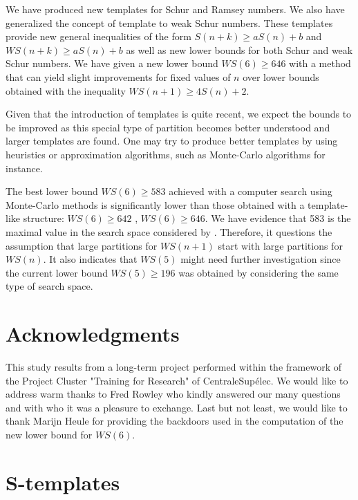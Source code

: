 \documentclass[final,onefignum,onetabnum]{siamart190516}
\newcommand{\WS}{\mathit{WS}}
\begin{document}
We have produced new templates for Schur and Ramsey numbers. We also have generalized the concept of template to weak Schur numbers.
These templates provide new general inequalities of the form \(S(n+k) \geqslant a S(n) + b\) and \(\WS(n+k) \geqslant a S(n) + b\)
as well as new lower bounds for both Schur and weak Schur numbers. We have given a new lower bound \(\WS(6) \geqslant 646\) with
a method that can yield slight improvements for fixed values of \(n\) over lower bounds obtained with the inequality
\(\WS(n+1) \geqslant 4 S(n) + 2\).

Given that the introduction of templates is quite recent, we expect the bounds to be improved as this special type of partition
becomes better understood and larger templates are found. One may try to produce better templates by using heuristics or
approximation algorithms, such as Monte-Carlo algorithms for instance.

The best lower bound \(\WS(6) \geqslant 583\) achieved with a computer search using Monte-Carlo methods
\cite{EliahouBook} is significantly lower than those obtained with a template-like structure: \(\WS(6) \geqslant 642\) \cite{RowleyWS},
\(\WS(6) \geqslant 646\). We have evidence that 583 is the maximal value in the search space considered by
\cite{EliahouBook,Bouzy2015AnAP,Rafilipojaona}. Therefore, it questions the assumption that large partitions for \(\WS(n+1)\)
start with large partitions for \(\WS(n)\). It also indicates that \(\WS(5)\) might need further investigation since the current lower
bound \(\WS(5) \geqslant 196\) \cite{ELIAHOU2012175} was obtained by considering the same type of search space.


\section{Acknowledgments}

This study results from a long-term project performed within the framework of the Project Cluster "Training for Research" of CentraleSupélec.
We would like to address warm thanks to Fred Rowley who kindly answered our many questions
and with who it was a pleasure to exchange. Last but not least, we would like to thank Marijn Heule for providing the backdoors
used in the computation of the new lower bound for \(\WS(6)\).





\appendix

\section{S-templates}
\label{S-templates}
\end{document}

